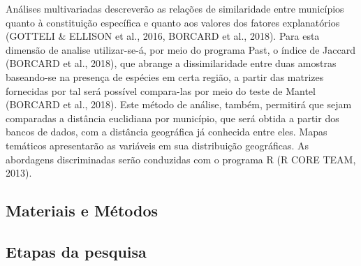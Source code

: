 Análises multivariadas descreverão as relações de similaridade entre municípios quanto à constituição específica e quanto aos valores dos fatores explanatórios (GOTTELI & ELLISON et al., 2016, BORCARD et al., 2018). Para esta dimensão de analise utilizar-se-á, por meio do programa Past, o índice de Jaccard (BORCARD et al., 2018), que abrange a dissimilaridade entre duas amostras baseando-se na presença de espécies em certa região, a partir das matrizes fornecidas por tal será possível compara-las por meio do teste de Mantel (BORCARD et al., 2018). Este método de análise, também, permitirá que sejam comparadas a distância euclidiana por município, que será obtida a partir dos bancos de dados, com a distância geográfica já conhecida entre eles. Mapas temáticos apresentarão as variáveis em sua distribuição geográficas. As abordagens discriminadas serão conduzidas com o programa R (R CORE TEAM, 2013).


\subsection{Materiais e Métodos}

\subsection{Etapas da pesquisa}